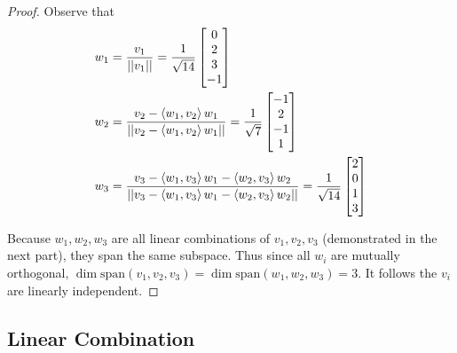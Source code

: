 \documentclass{article}
\theoremstyle{named}
\begin{document}
\begin{proof}
    Observe that 
\begin{align*}
    w_1 &= \frac{v_1}{||v_1||} = \frac{1}{\sqrt{14}} \begin{bmatrix} 0 \\ 2 \\ 3 \\ -1 \end{bmatrix} \\
    w_2 &= \frac{v_2 - \braket{w_1, v_2}w_1}{||v_2 - \braket{w_1, v_2}w_1||} = \frac{1}{\sqrt{7}} \begin{bmatrix} -1 \\ 2 \\ -1 \\ 1 \end{bmatrix} \\
    w_3 &= \frac{v_3 - \braket{w_1, v_3}w_1 - \braket{w_2, v_3}w_2}{||v_3 - \braket{w_1, v_3}w_1 - \braket{w_2, v_3}w_2||} = \frac{1}{\sqrt{14}} \begin{bmatrix} 2 \\ 0 \\ 1 \\ 3 \end{bmatrix}
\end{align*}

Because $w_1, w_2, w_3$ are all linear combinations of $v_1, v_2, v_3$ (demonstrated in the next part), they span the same subspace. Thus since all $w_i$ are mutually orthogonal, $\dim \text{span}(v_1, v_2, v_3) = \dim \text{span}(w_1, w_2, w_3) = 3$. It follows the $v_i$ are linearly independent. 

\end{proof}

\subsection{Linear Combination}
\end{document}
